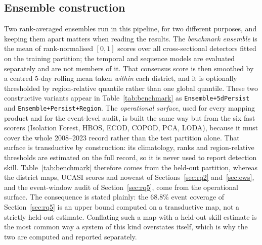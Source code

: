 \documentclass[preprint,12pt]{elsarticle}
\begin{document}
\subsection{Ensemble construction}\label{sec:ensemble}
Two rank-averaged ensembles run in this pipeline, for two different purposes, and
keeping them apart matters when reading the results. The \emph{benchmark ensemble}
is the mean of rank-normalised $[0,1]$ scores over all cross-sectional detectors
fitted on the training partition; the temporal and sequence models are evaluated
separately and are not members of it. That consensus score is then smoothed by a
centred 5-day rolling mean taken \emph{within} each district, and it is optionally
thresholded by region-relative quantile rather than one global quantile. These two
constructive variants appear in Table~\ref{tab:benchmark} as
\texttt{Ensemble+5dPersist} and \texttt{Ensemble+Persist+Region}. The
\emph{operational surface}, used for every mapping product and for the event-level
audit, is built the same way but from the six fast scorers (Isolation Forest, HBOS,
ECOD, COPOD, PCA, LODA), because it must cover the whole 2008--2023 record rather
than the test partition alone. That surface is transductive by construction: its
climatology, ranks and region-relative thresholds are estimated on the full record,
so it is never used to report detection skill. Table~\ref{tab:benchmark} therefore
comes from the held-out partition, whereas the district maps, UCASI scores and
nowcast of Sections~\ref{sec:rq2} and~\ref{sec:ews}, and the event-window audit of
Section~\ref{sec:rq5}, come from the operational surface. The consequence is stated
plainly: the 68.8\% event coverage of Section~\ref{sec:rq5} is an upper bound
computed on a transductive map, not a strictly held-out estimate. Conflating such
a map with a held-out skill estimate is the most common way a system of this kind
overstates itself, which is why the two are computed and reported separately.
\end{document}
